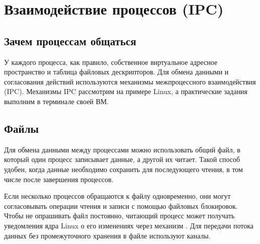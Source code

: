\chapter{Взаимодействие процессов (IPC)}
\label{ch:18-ipc}
\begingroup
\setlength{\parskip}{0pt}
\setlength{\parindent}{1.25cm}
\makeatletter
\let\@afterindentfalse\@afterindenttrue
\@afterindenttrue
\makeatother
\setlength{\intextsep}{8pt plus 2pt minus 2pt}
\setlength{\textfloatsep}{10pt plus 2pt minus 2pt}
\raggedbottom
{}
\captionsetup[figure]{font=footnotesize,justification=centering,singlelinecheck=false}

\section{Зачем процессам общаться}

У каждого процесса, как правило, собственное виртуальное адресное пространство и таблица файловых дескрипторов. Для обмена данными и согласования действий используются механизмы межпроцессного взаимодействия (IPC). Механизмы IPC рассмотрим на примере Linux, а практические задания выполним в терминале своей ВМ.

\section{Файлы}

Для обмена данными между процессами можно использовать общий файл, в который один процесс записывает данные, а другой их читает. Такой способ удобен, когда данные необходимо сохранить для последующего чтения, в том числе после завершения процессов.

Если несколько процессов обращаются к файлу одновременно, они могут согласовывать операции чтения и записи с помощью файловых блокировок. Чтобы не опрашивать файл постоянно, читающий процесс может получать уведомления ядра Linux о его изменениях через механизм . Для передачи потока данных без промежуточного хранения в файле используют каналы.


